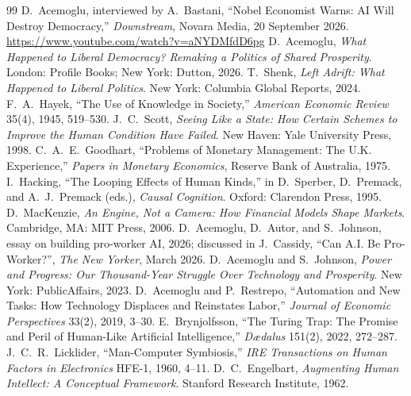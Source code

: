 \documentclass[11pt]{article}
\begin{document}
\begin{thebibliography}{99}
 D.~Acemoglu, interviewed by A.~Bastani, ``Nobel Economist Warns: AI Will Destroy Democracy,'' \emph{Downstream}, Novara Media, 20 September 2026. \url{https://www.youtube.com/watch?v=aNYDMfdD6pg}
 D.~Acemoglu, \emph{What Happened to Liberal Democracy? Remaking a Politics of Shared Prosperity}. London: Profile Books; New York: Dutton, 2026.
 T.~Shenk, \emph{Left Adrift: What Happened to Liberal Politics}. New York: Columbia Global Reports, 2024.
 F.~A.~Hayek, ``The Use of Knowledge in Society,'' \emph{American Economic Review} 35(4), 1945, 519--530.
 J.~C.~Scott, \emph{Seeing Like a State: How Certain Schemes to Improve the Human Condition Have Failed}. New Haven: Yale University Press, 1998.
 C.~A.~E.~Goodhart, ``Problems of Monetary Management: The U.K. Experience,'' \emph{Papers in Monetary Economics}, Reserve Bank of Australia, 1975.
 I.~Hacking, ``The Looping Effects of Human Kinds,'' in D.~Sperber, D.~Premack, and A.~J.~Premack (eds.), \emph{Causal Cognition}. Oxford: Clarendon Press, 1995.
 D.~MacKenzie, \emph{An Engine, Not a Camera: How Financial Models Shape Markets}. Cambridge, MA: MIT Press, 2006.
 D.~Acemoglu, D.~Autor, and S.~Johnson, essay on building pro-worker AI, 2026; discussed in J.~Cassidy, ``Can A.I. Be Pro-Worker?'', \emph{The New Yorker}, March 2026.
 D.~Acemoglu and S.~Johnson, \emph{Power and Progress: Our Thousand-Year Struggle Over Technology and Prosperity}. New York: PublicAffairs, 2023.
 D.~Acemoglu and P.~Restrepo, ``Automation and New Tasks: How Technology Displaces and Reinstates Labor,'' \emph{Journal of Economic Perspectives} 33(2), 2019, 3--30.
 E.~Brynjolfsson, ``The Turing Trap: The Promise and Peril of Human-Like Artificial Intelligence,'' \emph{D{\ae}dalus} 151(2), 2022, 272--287.
 J.~C.~R.~Licklider, ``Man-Computer Symbiosis,'' \emph{IRE Transactions on Human Factors in Electronics} HFE-1, 1960, 4--11.
 D.~C.~Engelbart, \emph{Augmenting Human Intellect: A Conceptual Framework}. Stanford Research Institute, 1962.
\end{thebibliography}
\end{document}

